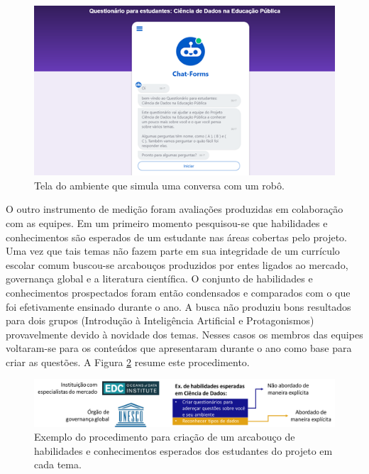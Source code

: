 \documentclass[
]{book}
\begin{document}
\begin{figure}

{\centering \includegraphics[width=1\linewidth,height=0.8\textheight]{images/Impactos/01} 

}

\caption{Tela do ambiente que simula uma conversa com um robô.}\label{fig:impacto01}
\end{figure}

O outro instrumento de medição foram avaliações produzidas em colaboração com as equipes. Em um primeiro momento pesquisou-se que habilidades e conhecimentos são esperados de um estudante nas áreas cobertas pelo projeto. Uma vez que tais temas não fazem parte em sua integridade de um currículo escolar comum buscou-se arcabouços produzidos por entes ligados ao mercado, governança global e a literatura científica. O conjunto de habilidades e conhecimentos prospectados foram então condensados e comparados com o que foi efetivamente ensinado durante o ano. A busca não produziu bons resultados para dois grupos (Introdução à Inteligência Artificial e Protagonismos) provavelmente devido à novidade dos temas. Nesses casos os membros das equipes voltaram-se para os conteúdos que apresentaram durante o ano como base para criar as questões. A Figura \ref{fig:impacto02} resume este procedimento.

\begin{figure}

{\centering \includegraphics[width=1\linewidth,height=0.8\textheight]{images/Impactos/02} 

}

\caption{Exemplo do procedimento para criação de um arcabouço de habilidades e conhecimentos esperados dos estudantes do projeto em cada tema.}\label{fig:impacto02}
\end{figure}
\end{document}
